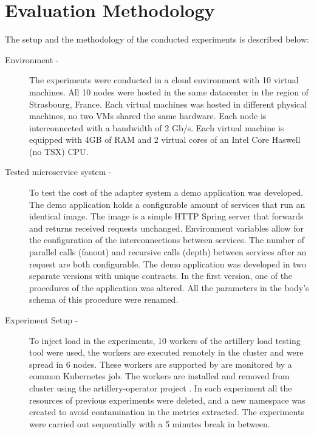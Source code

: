 \section{Evaluation Methodology} %
\label{sec:evaluation_methodology}

The setup and the methodology of the conducted experiments is described below:

\begin{description}
    \item[Environment -] The experiments were conducted in a cloud environment with 10 virtual machines.
    All 10 nodes were hosted in the same datacenter in the region of Strasbourg, France.
    Each virtual machines was hosted in different physical machines, no two VMs shared the same hardware.
    Each node is interconnected with a bandwidth of 2 Gb/s.
    Each virtual machine is equipped with 4GB of RAM and 2 virtual cores of an Intel Core Haswell (no TSX) CPU.
    \item[Tested microservice system -] To test the cost of the adapter system a demo application was developed.
    The demo application holds a configurable amount of services that run an identical image.
    The image is a simple HTTP Spring server that forwards and returns received requests unchanged.
    Environment variables allow for the configuration of the interconnections between services.
    The number of parallel calls (fanout) and recursive calls (depth) between services after an request are both configurable.
    The demo application was developed in two separate versions with unique contracts.
    In the first version, one of the procedures of the application was altered.
    All the parameters in the body's schema of this procedure were renamed.
    \item[Experiment Setup -] To inject load in the experiments, 10 workers of the artillery load testing tool were used,
    the workers are executed remotely in the cluster and were spread in 6 nodes.
    These workers are supported by are monitored by a common Kubernetes job.
    The workers are installed and removed from cluster using the artillery-operator project \cite{artilleryoperator}.
    In each experiment all the resources of previous experiments were deleted,
    and a new namespace was created to avoid contamination in the metrics extracted.
    The experiments were carried out sequentially with a 5 minutes break in between.


\end{description}
